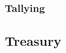 \documentclass[../hydrozoa.tex]{subfiles}
\begin{document}


\subsubsection{Tallying}%
\label{h:tallying}






\subsection{Treasury}%
\label{h:rule-based-treasury}





\end{document}
